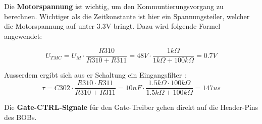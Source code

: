 
Die \textbf{Motorspannung} ist wichtig, um den Kommuntierungsvorgang zu berechnen. Wichtiger als die Zeitkonstante ist hier ein Spannungsteiler, welcher die Motorspannung auf unter 3.3V bringt. Dazu wird folgende Formel angewendet:

\begin{equation}
U_{TMC} = U_M \cdot \frac{R310}{R310 + R311} = 48V \cdot \frac{1k\Omega}{1k\Omega + 100k\Omega} = 0.7V
\end{equation}

Ausserdem ergibt sich aus er Schaltung ein Eingangsfilter \cite{andy_aka_capacitor_2013}:
\begin{equation}
\tau = C302 \cdot \frac{R310 \cdot R311}{R310 + R311} = 10nF \cdot \frac{1.5k\Omega \cdot 100k\Omega}{1.5k\Omega + 100k\Omega} = 147us
\end{equation}


Die \textbf{Gate-CTRL-Signale} für den Gate-Treiber gehen direkt auf die Header-Pins des BOBs.

%
%
%

